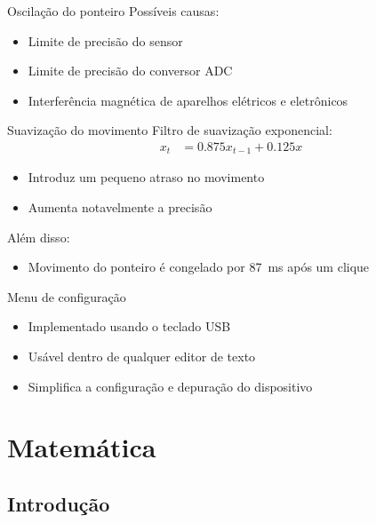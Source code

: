 \documentclass{beamer}
\begin{document}
\begin{frame}{Oscilação do ponteiro}
	Possíveis causas:
	\begin{itemize}
		\pause
		\item Limite de precisão do sensor
		\pause
		\item Limite de precisão do conversor ADC
		\pause
		\item Interferência magnética de aparelhos elétricos e eletrônicos
	\end{itemize}
\end{frame}


\begin{frame}{Suavização do movimento}
	\pause
	Filtro de suavização exponencial:
	\pause
	\begin{align*}
		x_t & = 0.875 x_{t-1} + 0.125 x
	\end{align*}
	\begin{itemize}
		\pause
		\item Introduz um pequeno atraso no movimento
		\pause
		\item Aumenta notavelmente a precisão
	\end{itemize}
	\pause
	\bigskip
	Além disso:
	\begin{itemize}
		\pause
		\item Movimento do ponteiro é congelado por \SI{87}{\milli\second} após um clique
	\end{itemize}
\end{frame}


\begin{frame}{Menu de configuração}
	\begin{itemize}
		\pause
		\item Implementado usando o teclado USB
		\pause
		\item Usável dentro de qualquer editor de texto
		\pause
		\item Simplifica a configuração e depuração do dispositivo
	\end{itemize}
\end{frame}


\section{Matemática}

\subsection{Introdução}
\end{document}
